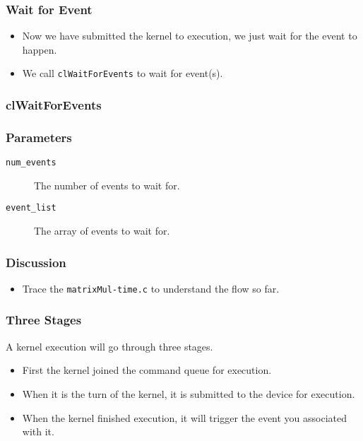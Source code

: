 \documentclass{beamer}
\begin{document}
\begin{frame}
\end{frame}

\begin{frame}
  \frametitle{Wait for Event}
  \begin{itemize}
    \item Now we have submitted the kernel to execution, we just wait
      for the event to happen.
    \item We call {\tt clWaitForEvents} to wait for event(s).
  \end{itemize}
\end{frame}

\begin{frame}
  \frametitle{clWaitForEvents}
\end{frame}

\begin{frame}
  \frametitle{Parameters}
  \begin{description}
  \item [\tt num\_events] The number of events to wait for.
  \item [\tt event\_list] The array of events to wait for.
  \end{description}
\end{frame}

\begin{frame}
\end{frame}

\begin{frame}
  \frametitle{Discussion}
  \begin{itemize}
    \item Trace the {\tt matrixMul-time.c} to understand the flow so far.
  \end{itemize}
\end{frame}

\begin{frame}
  \frametitle{Three Stages}
  A kernel execution will go through three stages.
  \begin{itemize}
    \item First the kernel joined the command queue for execution.
    \item When it is the turn of the kernel, it is submitted to the
      device for execution.
    \item When the kernel finished execution, it will trigger the
      event you associated with it.
  \end{itemize}
\end{frame}
\end{document}
